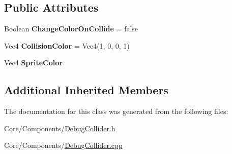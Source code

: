\subsection*{Public Attributes}
\begin{DoxyCompactItemize}
\item 
\hypertarget{classDCEngine_1_1Components_1_1DebugCollider_aa969737c20be282bb1dbfd2708ec061f}{Boolean {\bfseries Change\-Color\-On\-Collide} = false}\label{classDCEngine_1_1Components_1_1DebugCollider_aa969737c20be282bb1dbfd2708ec061f}

\item 
\hypertarget{classDCEngine_1_1Components_1_1DebugCollider_a576f44de845231d16221b72b274531f2}{Vec4 {\bfseries Collision\-Color} = Vec4(1, 0, 0, 1)}\label{classDCEngine_1_1Components_1_1DebugCollider_a576f44de845231d16221b72b274531f2}

\item 
\hypertarget{classDCEngine_1_1Components_1_1DebugCollider_a7c44cbb7084971b859aaa1563b9b9070}{Vec4 {\bfseries Sprite\-Color}}\label{classDCEngine_1_1Components_1_1DebugCollider_a7c44cbb7084971b859aaa1563b9b9070}

\end{DoxyCompactItemize}
\subsection*{Additional Inherited Members}


The documentation for this class was generated from the following files\-:\begin{DoxyCompactItemize}
\item 
Core/\-Components/\hyperlink{DebugCollider_8h}{Debug\-Collider.\-h}\item 
Core/\-Components/\hyperlink{DebugCollider_8cpp}{Debug\-Collider.\-cpp}\end{DoxyCompactItemize}
